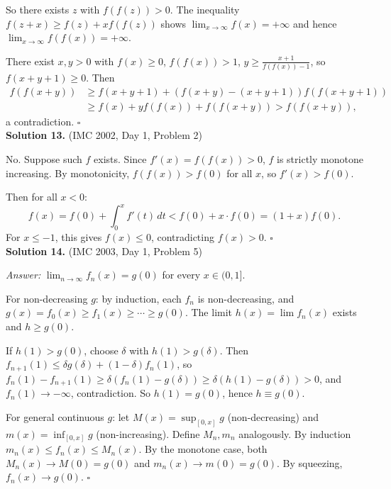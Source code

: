 \documentclass{article}
\begin{document}
So there exists \( z \) with \( f(f(z)) > 0 \). The inequality \( f(z + x) \geq f(z) + xf(f(z)) \) shows \( \lim_{x \to \infty} f(x) = +\infty \) and hence \( \lim_{x \to \infty} f(f(x)) = +\infty \).

There exist \( x, y > 0 \) with \( f(x) \geq 0 \), \( f(f(x)) > 1 \), \( y \geq \frac{x+1}{f(f(x))-1} \), so \( f(x+y+1) \geq 0 \). Then
\begin{align*}
f(f(x+y)) &\geq f(x+y+1) + (f(x+y) - (x+y+1))f(f(x+y+1)) \\
&\geq f(x) + yf(f(x)) + f(f(x+y)) > f(f(x+y)),
\end{align*}
a contradiction. \hfill\(\square\)
\\

\textbf{Solution 13.} (IMC 2002, Day 1, Problem 2)

No. Suppose such \( f \) exists. Since \( f'(x) = f(f(x)) > 0 \), \( f \) is strictly monotone increasing. By monotonicity, \( f(f(x)) > f(0) \) for all \( x \), so \( f'(x) > f(0) \).

Then for all \( x < 0 \):
\[
f(x) = f(0) + \int_0^x f'(t)\,dt < f(0) + x \cdot f(0) = (1 + x)f(0).
\]
For \( x \leq -1 \), this gives \( f(x) \leq 0 \), contradicting \( f(x) > 0 \). \hfill\(\square\)
\\

\textbf{Solution 14.} (IMC 2003, Day 1, Problem 5)

\textit{Answer:} \( \lim_{n \to \infty} f_n(x) = g(0) \) for every \( x \in (0,1] \).

For non-decreasing \( g \): by induction, each \( f_n \) is non-decreasing, and \( g(x) = f_0(x) \geq f_1(x) \geq \cdots \geq g(0) \). The limit \( h(x) = \lim f_n(x) \) exists and \( h \geq g(0) \).

If \( h(1) > g(0) \), choose \( \delta \) with \( h(1) > g(\delta) \). Then \( f_{n+1}(1) \leq \delta g(\delta) + (1-\delta)f_n(1) \), so \( f_n(1) - f_{n+1}(1) \geq \delta(f_n(1) - g(\delta)) \geq \delta(h(1) - g(\delta)) > 0 \), and \( f_n(1) \to -\infty \), contradiction. So \( h(1) = g(0) \), hence \( h \equiv g(0) \).

For general continuous \( g \): let \( M(x) = \sup_{[0,x]} g \) (non-decreasing) and \( m(x) = \inf_{[0,x]} g \) (non-increasing). Define \( M_n, m_n \) analogously. By induction \( m_n(x) \leq f_n(x) \leq M_n(x) \). By the monotone case, both \( M_n(x) \to M(0) = g(0) \) and \( m_n(x) \to m(0) = g(0) \). By squeezing, \( f_n(x) \to g(0) \). \hfill\(\square\)
\\
\end{document}
